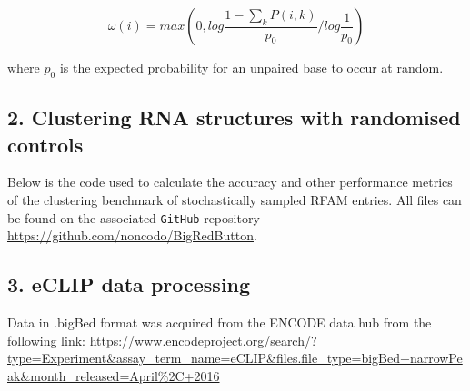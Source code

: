 \documentclass{bmcart}
\begin{document}
\begin{equation}\label{eq12}
	\omega(i) = max \left( 0, log \frac{1 - \sum_k P(i,k)}{p_0} / log \frac{1}{p_0} \right)
\end{equation}

\noindent  where $p_0$ is the expected probability for an unpaired base to occur at
random.

\subsection*{ 2. Clustering RNA structures with randomised controls }

Below is the code used to calculate the accuracy and other performance metrics of 
the clustering benchmark of stochastically sampled RFAM entries. All files can be found on the 
associated \texttt{GitHub} repository \url{https://github.com/noncodo/BigRedButton}.



\subsection*{ 3. eCLIP data processing }
Data in .bigBed format was acquired from the ENCODE data hub from the following link:
\url{https://www.encodeproject.org/search/?type=Experiment&assay_term_name=eCLIP&files.file_type=bigBed+narrowPeak&month_released=April\%2C+2016}
\end{document}
